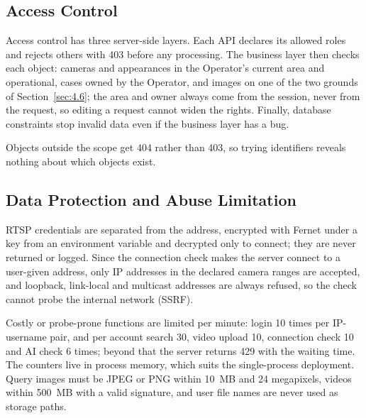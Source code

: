 \subsection{Access Control}
\label{sec:5.5.3}

Access control has three server-side layers. Each API declares its allowed roles and rejects others with 403 before any processing. The business layer then checks each object: cameras and appearances in the Operator's current area and operational, cases owned by the Operator, and images on one of the two grounds of Section~\ref{sec:4.6}; the area and owner always come from the session, never from the request, so editing a request cannot widen the rights. Finally, database constraints stop invalid data even if the business layer has a bug.

Objects outside the scope get 404 rather than 403, so trying identifiers reveals nothing about which objects exist.

\subsection{Data Protection and Abuse Limitation}
\label{sec:5.5.4}

RTSP credentials are separated from the address, encrypted with Fernet under a key from an environment variable and decrypted only to connect; they are never returned or logged. Since the connection check makes the server connect to a user-given address, only IP addresses in the declared camera ranges are accepted, and loopback, link-local and multicast addresses are always refused, so the check cannot probe the internal network (SSRF).

Costly or probe-prone functions are limited per minute: login 10 times per IP-username pair, and per account search 30, video upload 10, connection check 10 and AI check 6 times; beyond that the server returns 429 with the waiting time. The counters live in process memory, which suits the single-process deployment. Query images must be JPEG or PNG within 10~MB and 24 megapixels, videos within 500~MB with a valid signature, and user file names are never used as storage paths.
